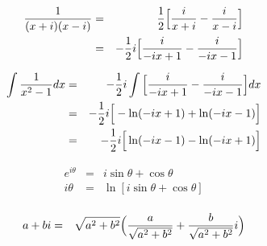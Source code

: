 
\begin{eqnarray*}
{1\over{(x+i)(x-i)}} &=& {1\over2}\Big[{i\over{x+i}} - {i\over{x-i}}\Big]\\
              &=& -{1\over2}i\Big[{i\over{-ix+1}} - {i\over{-ix-1}}\Big]\\
\end{eqnarray*}


\begin{eqnarray*}
\int{1\over{x^2-1}}dx &=& -{1\over2}i\int\Big[{i\over{-ix+1}} - {i\over{-ix-1}}\Big]dx\\
	&=& -{1\over2}i\Big[-\ln(-ix+1) + \ln(-ix-1)\Big] \\
	&=& -{1\over2}i\Big[\ln(-ix-1) - \ln(-ix+1)\Big] \\
\end{eqnarray*}


\begin{eqnarray*}
e^{i\theta} &=& i\sin\theta + \cos\theta \\
{i\theta} &=& \ln[i\sin\theta + \cos\theta] \\
\end{eqnarray*}


\begin{eqnarray*}
a+bi &=& \sqrt{a^2+b^2}\Big({a\over\sqrt{a^2+b^2}} + {b\over\sqrt{a^2+b^2}}i\Big) \\
\end{eqnarray*}


